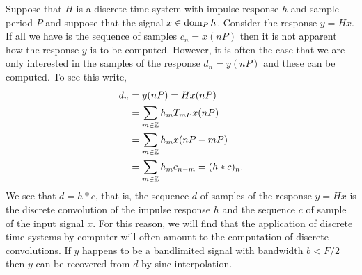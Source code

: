 Suppose that $H$ is a discrete-time system with impulse response $h$ and sample period $P$ and suppose that the signal $x \in \operatorname{dom}_P h$.  Consider the response $y = Hx$.  If all we have is the sequence of samples $c_n = x(nP)$ then it is not apparent how the response $y$ is to be computed.  However, it is often the case that we are only interested in the samples of the response $d_n = y(nP)$ and these can be computed.  To see this write,
\begin{align*}
d_n &= y(nP) = Hx(nP) \\
&= \sum_{m \in {\mathbb Z}} h_m T_{mP}x(nP) \\
&= \sum_{m \in {\mathbb Z}} h_m x(nP - mP) \\
&= \sum_{m \in {\mathbb Z}} h_m c_{n-m} = (h * c)_n.
\end{align*}
We see that $d = h * c$, that is, the sequence $d$ of samples of the response $y = Hx$ is the discrete convolution of the impulse response $h$ and the sequence $c$ of sample of the input signal $x$.  For this reason, we will find that the application of discrete time systems by computer will often amount to the computation of discrete convolutions.  If $y$ happens to be a bandlimited signal with bandwidth $b < F/2$ then $y$ can be recovered from $d$ by sinc interpolation.

% 


